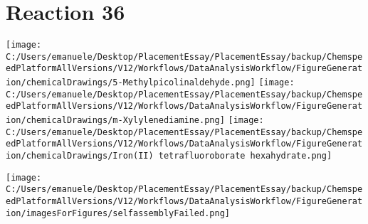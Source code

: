 \documentclass{article}%
\begin{document}
\section*{Reaction 36}%
%
\begin{scheme}[H]%
\begin{minipage}{0.5\textwidth}%
\texttt{[image: C:/Users/emanuele/Desktop/PlacementEssay/PlacementEssay/backup/ChemspeedPlatformAllVersions/V12/Workflows/DataAnalysisWorkflow/FigureGeneration/chemicalDrawings/5-Methylpicolinaldehyde.png]}%
\texttt{[image: C:/Users/emanuele/Desktop/PlacementEssay/PlacementEssay/backup/ChemspeedPlatformAllVersions/V12/Workflows/DataAnalysisWorkflow/FigureGeneration/chemicalDrawings/m-Xylylenediamine.png]}%
\texttt{[image: C:/Users/emanuele/Desktop/PlacementEssay/PlacementEssay/backup/ChemspeedPlatformAllVersions/V12/Workflows/DataAnalysisWorkflow/FigureGeneration/chemicalDrawings/Iron(II) tetrafluoroborate hexahydrate.png]}%
\end{minipage}%
\begin{minipage}{0.5\textwidth}%
\begin{center}%
\texttt{[image: C:/Users/emanuele/Desktop/PlacementEssay/PlacementEssay/backup/ChemspeedPlatformAllVersions/V12/Workflows/DataAnalysisWorkflow/FigureGeneration/imagesForFigures/selfassemblyFailed.png]}%
\end{center}%
\end{minipage}%
\caption{Self-assembly of components 3, 18, with Iron(II) in a 3.0:1.5:1.0 molar ratio in CH$_3$CN at 60\textdegree C for 40h. These are the reagents (starting materials) for reaction 36.}%
\end{scheme}%
\end{document}
